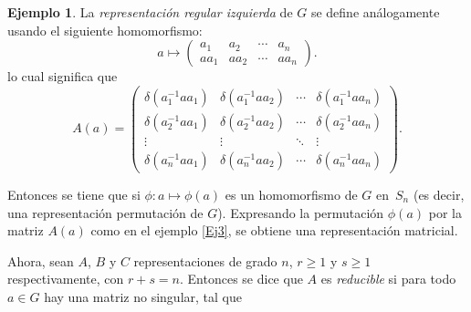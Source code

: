 \documentclass[12pt]{book}
\theoremstyle{definition}
\newtheorem{example}[theorem]{Ejemplo}
\newcounter{in}
\begin{document}
\begin{example}
  La \emph{representación regular izquierda} de $G$ se define análogamente
  usando el siguiente homomorfismo:
  \begin{equation*}
    a \mapsto
    \begin{pmatrix}
      a_{1} & a_{2} & \cdots  & a_{n}\\ 
      aa_{1} & aa_{2} & \cdots & aa_{n}
    \end{pmatrix}.
  \end{equation*}
  lo cual significa que
  \begin{equation}
    \label{eq:8}
    A\left(a\right) = 
    \begin{pmatrix}
      \delta\left(a_{1}^{-1}aa_{1}\right) & \delta\left(a_{1}^{-1}aa_{2}\right) & \cdots  & \delta\left(a_{1}^{-1}aa_{n}\right)\\
      \delta\left(a_{2}^{-1}aa_{1}\right) & \delta\left(a_{2}^{-1}aa_{2}\right) & \cdots  & \delta\left(a_{2}^{-1}aa_{n}\right)\\ 
      \vdots & \vdots & \ddots & \vdots\\
      \delta\left(a_{n}^{-1}aa_{1}\right) & \delta\left(a_{n}^{-1}aa_{2}\right) & \cdots  & \delta\left(a_{n}^{-1}aa_{n}\right)
    \end{pmatrix}
    .
  \end{equation}
\end{example}

Entonces se tiene que si $\phi \colon a \mapsto \phi\left(a\right)$ es
un homomorfismo de $G$ en~$S_{n}$ (es decir, una representación
permutación de $G$). Expresando la permutación $\phi\left(a\right)$
por la matriz $A\left(a\right)$ como en el ejemplo \ref{Ej3}, se
obtiene una representación matricial.

Ahora, sean $A$, $B$ y $C$ representaciones de grado $n$,
$r \geq 1$ y $s \geq 1$ respectivamente, con $r+s=n$. Entonces se dice
que $A$ es \emph{reducible} si para todo $a \in G$ hay una matriz no
singular, tal que
\end{document}
